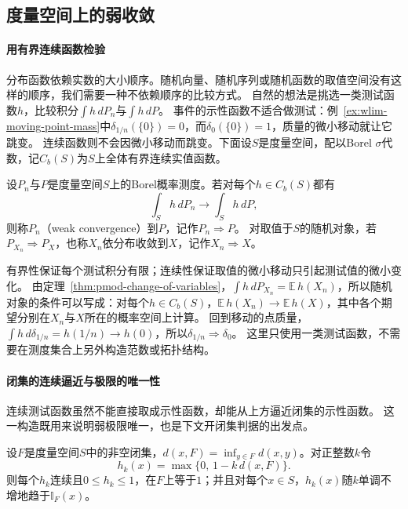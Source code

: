 \subsection{度量空间上的弱收敛}

\paragraph{用有界连续函数检验}
分布函数依赖实数的大小顺序。随机向量、随机序列或随机函数的取值空间没有这样的顺序，我们需要一种不依赖顺序的比较方式。
自然的想法是挑选一类测试函数$h$，比较积分$\int h\,dP_n$与$\int h\,dP$。
事件的示性函数不适合做测试：例~\ref{ex:wlim-moving-point-mass}中$\delta_{1/n}(\{0\})=0$，而$\delta_0(\{0\})=1$，质量的微小移动就让它跳变。
连续函数则不会因微小移动而跳变。下面设$S$是度量空间，配以Borel $\sigma$代数，记$C_b(S)$为$S$上全体有界连续实值函数。

\begin{definition}[弱收敛]
\label{def:wlim-weak}
设$P_n$与$P$是度量空间$S$上的Borel概率测度。若对每个$h\in C_b(S)$都有
\[
  \int_S h\,dP_n\to\int_S h\,dP,
\]
则称$P_n$（weak convergence）到$P$，记作$P_n\Rightarrow P$。
对取值于$S$的随机对象，若$P_{X_n}\Rightarrow P_X$，也称$X_n$依分布收敛到$X$，记作$X_n\Rightarrow X$。
\end{definition}

有界性保证每个测试积分有限；连续性保证取值的微小移动只引起测试值的微小变化。
由定理~\ref{thm:pmod-change-of-variables}，$\int h\,dP_{X_n}=\mathbb E\,h(X_n)$，所以随机对象的条件可以写成：对每个$h\in C_b(S)$，$\mathbb E\,h(X_n)\to\mathbb E\,h(X)$，其中各个期望分别在$X_n$与$X$所在的概率空间上计算。
回到移动的点质量，$\int h\,d\delta_{1/n}=h(1/n)\to h(0)$，所以$\delta_{1/n}\Rightarrow\delta_0$。
这里只使用一类测试函数，不需要在测度集合上另外构造范数或拓扑结构。

\paragraph{闭集的连续逼近与极限的唯一性}
连续测试函数虽然不能直接取成示性函数，却能从上方逼近闭集的示性函数。
这一构造既用来说明弱极限唯一，也是下文开闭集判据的出发点。

\begin{lemma}[闭集的距离逼近]
\label{lem:wlim-closed-approximation}
设$F$是度量空间$S$中的非空闭集，$d(x,F)=\inf_{y\in F}d(x,y)$。对正整数$k$令
\[
  h_k(x)=\max\{0,\,1-k\,d(x,F)\}.
\]
则每个$h_k$连续且$0\leq h_k\leq1$，在$F$上等于$1$；并且对每个$x\in S$，$h_k(x)$随$k$单调不增地趋于$\mathbb I_F(x)$。
\end{lemma}

